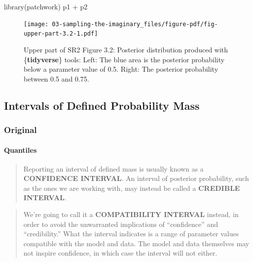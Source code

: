\documentclass[
  letterpaper,
  DIV=11,
  numbers=noendperiod]{scrreprt}
\let\oldparagraph\paragraph
\renewcommand{\paragraph}[1]{\oldparagraph{#1}\mbox{}}
\newenvironment{Shaded}{\begin{snugshade}}{\end{snugshade}}
\newcommand{\FunctionTok}[1]{\textcolor[rgb]{0.28,0.35,0.67}{#1}}
\newcommand{\InformationTok}[1]{\textcolor[rgb]{0.37,0.37,0.37}{#1}}
\newcommand{\NormalTok}[1]{\textcolor[rgb]{0.00,0.23,0.31}{#1}}
\newcommand{\SpecialCharTok}[1]{\textcolor[rgb]{0.37,0.37,0.37}{#1}}
\begin{document}
\begin{Shaded}
\begin{Highlighting}[]
\FunctionTok{library}\NormalTok{(patchwork)}
\NormalTok{p1 }\SpecialCharTok{+}\NormalTok{ p2}
\InformationTok{\textasciigrave{}\textasciigrave{}\textasciigrave{}}
\end{Highlighting}
\end{Shaded}

\begin{figure}[H]

{\centering \texttt{[image: 03-sampling-the-imaginary\_files/figure-pdf/fig-upper-part-3.2-1.pdf]}

}

\caption{\label{fig-upper-part-3.2}Upper part of SR2 Figure 3.2:
Posterior distribution produced with \{\textbf{tidyverse}\} tools: Left:
The blue area is the posterior probability below a parameter value of
0.5. Right: The posterior probability between 0.5 and 0.75.}

\end{figure}

\hypertarget{intervals-of-defined-probability-mass}{%
\subsection{Intervals of Defined Probability
Mass}\label{intervals-of-defined-probability-mass}}

\hypertarget{original-12}{%
\subsubsection{Original}\label{original-12}}

\hypertarget{quantiles}{%
\paragraph{Quantiles}\label{quantiles}}

\begin{quote}
Reporting an interval of defined mass is usually known as a
\textbf{CONFIDENCE INTERVAL}. An interval of posterior probability, such
as the ones we are working with, may instead be called a
\textbf{CREDIBLE INTERVAL}.
\end{quote}

\begin{quote}
We're going to call it a \textbf{COMPATIBILITY INTERVAL} instead, in
order to avoid the unwarranted implications of ``confidence'' and
``credibility.'' What the interval indicates is a range of parameter
values compatible with the model and data. The model and data themselves
may not inspire confidence, in which case the interval will not either.
\end{quote}
\end{document}

